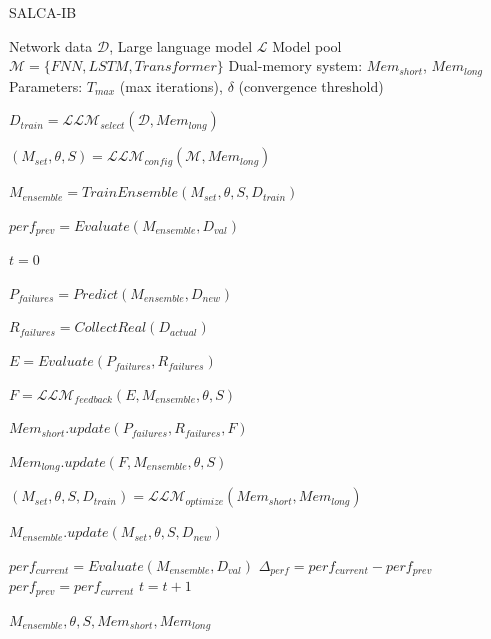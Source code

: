 \documentclass[conference]{IEEEtran}
\begin{document}
\begin{algorithm}[t]
    \caption{SALCA-IB}
    \label{alg:salca-ib}
    \begin{algorithmic}[1]
    \Require
        \Statex \hspace{-1em}Network data $\mathcal{D}$, Large language model $\mathcal{L}$
        \Statex \hspace{-1em}Model pool $\mathcal{M} = \{FNN, LSTM, Transformer\}$
        \Statex \hspace{-1em}Dual-memory system: $Mem_{short}$, $Mem_{long}$
        \Statex \hspace{-1em}Parameters: $T_{max}$ (max iterations), $\delta$ (convergence threshold)
    
    \vspace{0.5em}
    \State $D_{train} = \mathcal{LLM}_{select}(\mathcal{D}, Mem_{long})$ 
    
    \State $(M_{set}, \theta, S) = \mathcal{LLM}_{config}(\mathcal{M}, Mem_{long})$ 
    
    \State $M_{ensemble} = TrainEnsemble(M_{set}, \theta, S, D_{train})$ 
    
    \State $perf_{prev} = Evaluate(M_{ensemble}, D_{val})$ 
    
    \State $t = 0$
    
        \State $P_{failures} = Predict(M_{ensemble}, D_{new})$ 
        
        \State $R_{failures} = CollectReal(D_{actual})$ 
        
        \State $E = Evaluate(P_{failures}, R_{failures})$ 
        
        \State $F = \mathcal{LLM}_{feedback}(E, M_{ensemble}, \theta, S)$ 
        
        \State $Mem_{short}.update(P_{failures}, R_{failures}, F)$ 
        
        \State $Mem_{long}.update(F, M_{ensemble}, \theta, S)$ 
        
        \State $(M_{set}, \theta, S, D_{train}) = \mathcal{LLM}_{optimize}(Mem_{short}, Mem_{long})$ 
        
        \State $M_{ensemble}.update(M_{set}, \theta, S, D_{new})$ 
        
        \State $perf_{current} = Evaluate(M_{ensemble}, D_{val})$     
        \State $\Delta_{perf} = perf_{current} - perf_{prev}$
        \State $perf_{prev} = perf_{current}$
        \State $t = t + 1$
    \EndWhile
    
    \State \Return $M_{ensemble}, \theta, S, Mem_{short}, Mem_{long}$ 
    \end{algorithmic}
    \end{algorithm}
    
\end{document}
